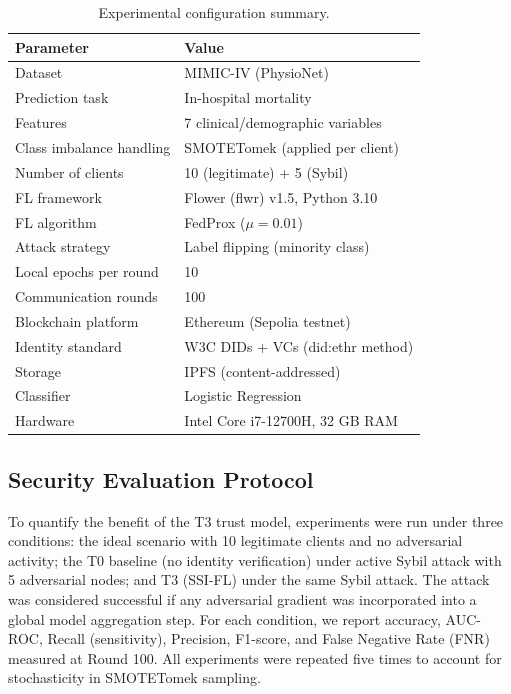 \documentclass{sbc2023}
\begin{document}
\begin{table}[!ht]
\caption{Experimental configuration summary.}
\label{tab:setup}
\centering
\begin{tabularx}{\columnwidth}{lX}
\toprule
\textbf{Parameter} & \textbf{Value} \\
\midrule
Dataset & MIMIC-IV (PhysioNet) \\
Prediction task & In-hospital mortality \\
Features & 7 clinical/demographic variables \\
Class imbalance handling & SMOTETomek (applied per client) \\
Number of clients & 10 (legitimate) + 5 (Sybil) \\
FL framework & Flower (flwr) v1.5, Python 3.10 \\
FL algorithm & FedProx ($\mu = 0.01$) \\
Attack strategy & Label flipping (minority class) \\
Local epochs per round & 10 \\
Communication rounds & 100 \\
Blockchain platform & Ethereum (Sepolia testnet) \\
Identity standard & W3C DIDs + VCs (did:ethr method) \\
Storage & IPFS (content-addressed) \\
Classifier & Logistic Regression \\
Hardware & Intel Core i7-12700H, 32 GB RAM \\
\bottomrule
\end{tabularx}
\end{table}

\subsection{Security Evaluation Protocol}

To quantify the benefit of the T3 trust model, experiments were run under three conditions: the ideal scenario with 10 legitimate clients and no adversarial activity; the T0 baseline (no identity verification) under active Sybil attack with 5 adversarial nodes; and T3 (SSI-FL) under the same Sybil attack. The attack was considered successful if any adversarial gradient was incorporated into a global model aggregation step. For each condition, we report accuracy, AUC-ROC, Recall (sensitivity), Precision, F1-score, and False Negative Rate (FNR) measured at Round 100. All experiments were repeated five times to account for stochasticity in SMOTETomek sampling.
\end{document}
